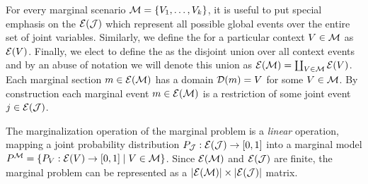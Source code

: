 \documentclass[aps, 10pt, english, twoside, pra, nofootinbib, tightenlines, longbibliography, superscriptaddress]{revtex4-1}
\begin{document}
    For every marginal scenario $\mscenario = \bc{V_1, \ldots, V_k}$, it is useful to put special emphasis on the  $\Events{\jointvar}$ which represent all possible global events over the entire set of joint variables. Similarly, we define the  for a particular context $V \in \mathcal{M}$ as $\Events{V}$. Finally, we elect to define the  as the disjoint union over all context events and by an abuse of notation we will denote this union as $\Events{\mscenario} = \coprod_{V \in \mscenario} \Events{V}$. Each marginal section $m \in \Events{\mscenario}$ has a domain $\Dom{m} = V$ for some $V \in \mathcal{M}$. By construction each marginal event $m \in \Events{\mscenario}$ is a restriction of some joint event $j \in \Events{\jointvar}$.

    The marginalization operation of the marginal problem is a \textit{linear} operation, mapping a joint probability distribution $\prob[\jointvar] : \Events{\jointvar} \to \bs{0,1}$ into a marginal model $\prob^{\mscenario} = \bc{\prob[V] : \Events{V} \to \bs{0,1} \mid V \in \mscenario}$. Since $\Events{\mscenario}$ and $\Events{\jointvar}$ are finite, the marginal problem can be represented as a $\abs{\Events{\mscenario}} \times \abs{\Events{\jointvar}}$ matrix.
\end{document}
